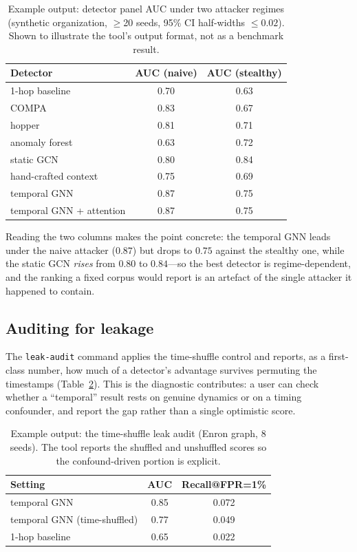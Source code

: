 \begin{table}[H]
\centering
\caption{Example \tool output: detector panel AUC under two attacker regimes (synthetic
organization, $\ge$20 seeds, 95\% CI half-widths $\le 0.02$). Shown to illustrate the tool's
output format, not as a benchmark result.}
\label{tab:panel}
\small
\begin{tabular}{@{}lcc@{}}
\toprule
Detector & AUC (naive) & AUC (stealthy) \\
\midrule
1-hop baseline                       & 0.70 & 0.63 \\
COMPA \cite{egele2013compa}          & 0.83 & 0.67 \\
hopper \cite{ho2021hopper}           & 0.81 & 0.71 \\
anomaly forest                       & 0.63 & 0.72 \\
static GCN \cite{kipf2017semisupervised} & 0.80 & 0.84 \\
hand-crafted context                 & 0.75 & 0.69 \\
temporal GNN \cite{rossi2020temporal} & 0.87 & 0.75 \\
temporal GNN + attention \cite{xu2020inductive} & 0.87 & 0.75 \\
\bottomrule
\end{tabular}
\end{table}

Reading the two columns makes the point concrete: the temporal GNN leads under the naive attacker
($0.87$) but drops to $0.75$ against the stealthy one, while the static GCN \emph{rises} from $0.80$ to
$0.84$---so the best detector is regime-dependent, and the ranking a fixed corpus would report is an artefact of
the single attacker it happened to contain.

\subsection{Auditing for leakage}
The \texttt{leak-audit} command applies the time-shuffle control and reports, as a first-class
number, how much of a detector's advantage survives permuting the timestamps
(Table~\ref{tab:leak}). This is the diagnostic \tool contributes: a user can check whether a
``temporal'' result rests on genuine dynamics or on a timing confounder, and report the gap
rather than a single optimistic score.

\begin{table}[H]
\centering
\caption{Example \tool output: the time-shuffle leak audit (Enron graph, 8 seeds). The tool
reports the shuffled and unshuffled scores so the confound-driven portion is explicit.}
\label{tab:leak}
\small
\begin{tabular}{@{}lcc@{}}
\toprule
Setting & AUC & Recall@FPR=1\% \\
\midrule
temporal GNN                 & 0.85 & 0.072 \\
temporal GNN (time-shuffled) & 0.77 & 0.049 \\
1-hop baseline               & 0.65 & 0.022 \\
\bottomrule
\end{tabular}
\end{table}

